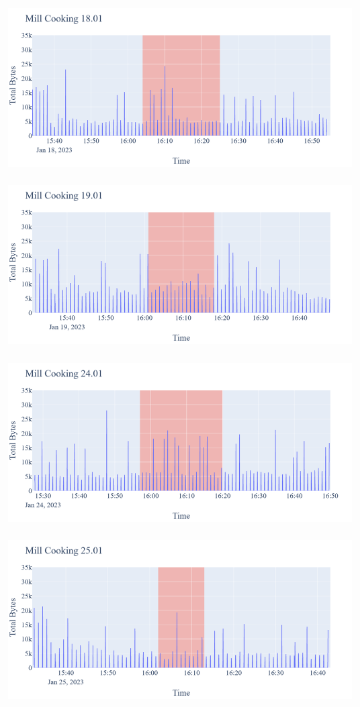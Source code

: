 \begin{figure}[H]
\begin{subfigure}[b]{0.5\textwidth}
        \centering
        \includegraphics[width=1.2\hsize]{figures/Mill_Cooking_Bytes_18.01.png}
    \end{subfigure}
    \begin{subfigure}[b]{0.5\textwidth}
        \centering
        \includegraphics[width=1.2\hsize]{figures/Mill_Cooking_Bytes_19.01.png}
    \end{subfigure}
    \begin{subfigure}[b]{0.5\textwidth}
        \centering
        \includegraphics[width=1.2\hsize]{figures/Mill_Cooking_Bytes_24.01.png}
    \end{subfigure}
    \begin{subfigure}[b]{0.5\textwidth}
        \centering
        \includegraphics[width=1.2\hsize]{figures/Mill_Cooking_Bytes_25.01.png}

\end{subfigure}
\end{figure}
